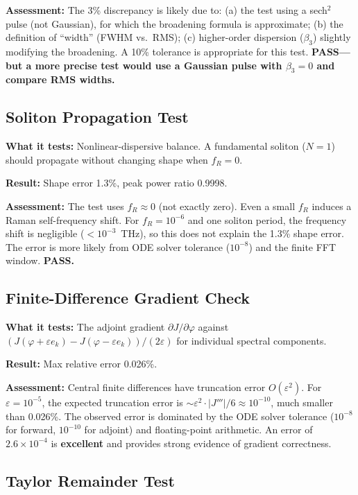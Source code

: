 \documentclass[12pt,a4paper]{article}
\theoremstyle{definition}
\begin{document}
\textbf{Assessment:} The 3\% discrepancy is likely due to: (a) the test using a sech$^2$ pulse (not Gaussian), for which the broadening formula is approximate; (b) the definition of ``width'' (FWHM vs.\ RMS); (c) higher-order dispersion ($\beta_3$) slightly modifying the broadening. A 10\% tolerance is appropriate for this test. \textbf{PASS---but a more precise test would use a Gaussian pulse with $\beta_3 = 0$ and compare RMS widths.}

\subsection{Soliton Propagation Test}

\textbf{What it tests:} Nonlinear-dispersive balance. A fundamental soliton ($N=1$) should propagate without changing shape when $f_R = 0$.

\textbf{Result:} Shape error 1.3\%, peak power ratio 0.9998.

\textbf{Assessment:} The test uses $f_R \approx 0$ (not exactly zero). Even a small $f_R$ induces a Raman self-frequency shift. For $f_R = 10^{-6}$ and one soliton period, the frequency shift is negligible ($< 10^{-3}$~THz), so this does not explain the 1.3\% shape error. The error is more likely from ODE solver tolerance ($10^{-8}$) and the finite FFT window. \textbf{PASS.}

\subsection{Finite-Difference Gradient Check}

\textbf{What it tests:} The adjoint gradient $\partial J/\partial\varphi$ against $(J(\varphi + \varepsilon e_k) - J(\varphi - \varepsilon e_k))/(2\varepsilon)$ for individual spectral components.

\textbf{Result:} Max relative error 0.026\%.

\textbf{Assessment:} Central finite differences have truncation error $O(\varepsilon^2)$. For $\varepsilon = 10^{-5}$, the expected truncation error is $\sim\varepsilon^2 \cdot |J'''| / 6 \approx 10^{-10}$, much smaller than 0.026\%. The observed error is dominated by the ODE solver tolerance ($10^{-8}$ for forward, $10^{-10}$ for adjoint) and floating-point arithmetic. An error of $2.6 \times 10^{-4}$ is \textbf{excellent} and provides strong evidence of gradient correctness.

\subsection{Taylor Remainder Test}
\end{document}
